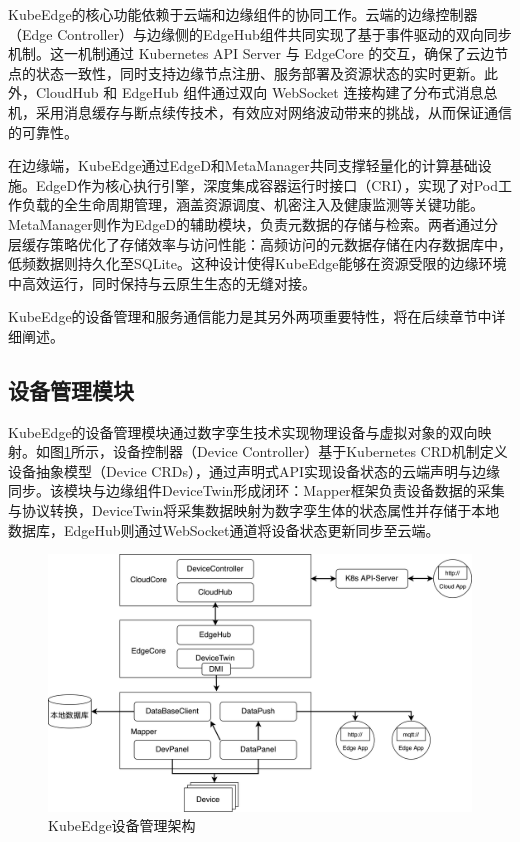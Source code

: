 KubeEdge的核心功能依赖于云端和边缘组件的协同工作。云端的边缘控制器（Edge Controller）与边缘侧的EdgeHub组件共同实现了基于事件驱动的双向同步机制。这一机制通过 Kubernetes API Server 与 EdgeCore 的交互，确保了云边节点的状态一致性，同时支持边缘节点注册、服务部署及资源状态的实时更新。此外，CloudHub 和 EdgeHub 组件通过双向 WebSocket 连接构建了分布式消息总机，采用消息缓存与断点续传技术，有效应对网络波动带来的挑战，从而保证通信的可靠性。

在边缘端，KubeEdge通过EdgeD和MetaManager共同支撑轻量化的计算基础设施。EdgeD作为核心执行引擎，深度集成容器运行时接口（CRI），实现了对Pod工作负载的全生命周期管理，涵盖资源调度、机密注入及健康监测等关键功能。MetaManager则作为EdgeD的辅助模块，负责元数据的存储与检索。两者通过分层缓存策略优化了存储效率与访问性能：高频访问的元数据存储在内存数据库中，低频数据则持久化至SQLite。这种设计使得KubeEdge能够在资源受限的边缘环境中高效运行，同时保持与云原生生态的无缝对接。

KubeEdge的设备管理和服务通信能力是其另外两项重要特性，将在后续章节中详细阐述。

\subsection{设备管理模块}

KubeEdge的设备管理模块通过数字孪生技术实现物理设备与虚拟对象的双向映射。如图\ref{fig:4-2mapper}所示，设备控制器（Device Controller）基于Kubernetes CRD机制定义设备抽象模型（Device CRDs），通过声明式API实现设备状态的云端声明与边缘同步。该模块与边缘组件DeviceTwin形成闭环：Mapper框架负责设备数据的采集与协议转换，DeviceTwin将采集数据映射为数字孪生体的状态属性并存储于本地数据库，EdgeHub则通过WebSocket通道将设备状态更新同步至云端。

\begin{figure}[ht]
  \centering
  \includegraphics[width=\linewidth]{pics/4-2mapper.png}
  \caption{KubeEdge设备管理架构\cite{xiong2018extend}}
  \label{fig:4-2mapper}
\end{figure}

